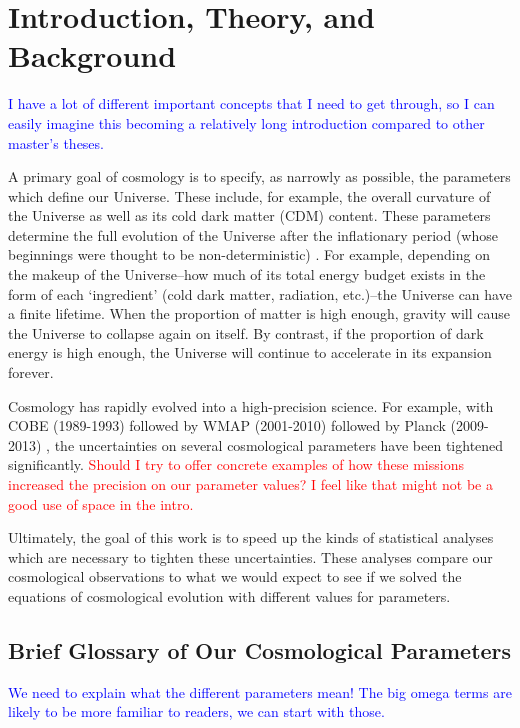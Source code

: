 \chapter{Introduction, Theory, and Background}

\textcolor{blue}{I have a lot of different important concepts that I need to 
get through, so I can easily imagine this becoming a relatively long 
introduction compared to other master's theses.}

A primary goal of cosmology is to specify, as narrowly as possible, the 
parameters which define our Universe. These include, for example, the overall 
curvature of the Universe as well as its cold dark matter (CDM) content. These
parameters determine the full evolution of the Universe after the inflationary
period (whose beginnings were thought to be non-deterministic)
. For example, depending on
the makeup of the Universe--how much of its total energy budget exists in the
form of each `ingredient' (cold dark matter, radiation, etc.)--the Universe
can have a finite lifetime. When the proportion of matter is high enough,
gravity will cause the Universe to collapse again on itself. By contrast, if
the proportion of dark energy is high enough, the Universe will continue to
accelerate in its expansion forever.

Cosmology has rapidly evolved into a high-precision science. For example, with
COBE (1989-1993)  followed by WMAP (2001-2010)  followed 
by Planck (2009-2013) , the uncertainties on several cosmological 
parameters have been tightened significantly.
\textcolor{red}{Should I try to offer concrete examples of how these missions
increased the precision on our parameter values? I feel like that might not be
a good use of space in the intro.}

Ultimately, the goal of this work is to speed up the kinds of statistical
analyses which are necessary to tighten these uncertainties.
These analyses compare our cosmological observations to what we
would expect to see if we solved the equations of cosmological evolution with
different values for parameters.

\section{Brief Glossary of Our Cosmological Parameters}
\label{sec: param_glossary}

\textcolor{blue}{We need to explain what the different parameters mean! The
big omega terms are likely to be more familiar to readers, we can start with 
those.}

